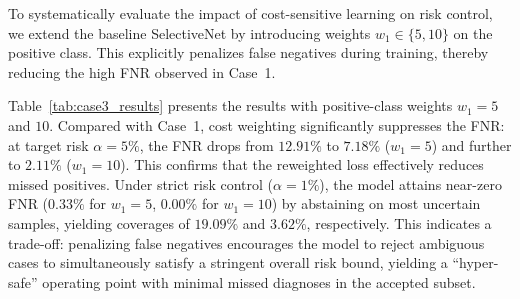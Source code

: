 \documentclass[journal,twoside,web]{ieeecolor}
\begin{document}
To systematically evaluate the impact of cost-sensitive learning on risk control, we extend the baseline SelectiveNet by introducing weights $w_1 \in \{5, 10\}$ on the positive class. This explicitly penalizes false negatives during training, thereby reducing the high FNR observed in Case~1.
\begin{table}[htbp]
    \centering
    \caption{The selective classification performance of Case 3 ($w_{1}=5$ and $w_{1}=10$).}
    \label{tab:case3_results}
\end{table}

Table~\ref{tab:case3_results} presents the results with positive-class weights $w_1 = 5$ and $10$. Compared with Case~1, cost weighting significantly suppresses the FNR: at target risk $\alpha=5\%$, the FNR drops from $12.91\%$ to $7.18\%$ ($w_1=5$) and further to $2.11\%$ ($w_1=10$). This confirms that the reweighted loss effectively reduces missed positives. Under strict risk control ($\alpha=1\%$), the model attains near-zero FNR ($0.33\%$ for $w_1=5$, $0.00\%$ for $w_1=10$) by abstaining on most uncertain samples, yielding coverages of $19.09\%$ and $3.62\%$, respectively. This indicates a trade-off: penalizing false negatives encourages the model to reject ambiguous cases to simultaneously satisfy a stringent overall risk bound, yielding a “hyper-safe” operating point with minimal missed diagnoses in the accepted subset.
\end{document}
